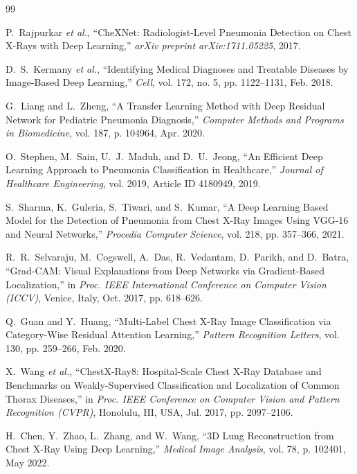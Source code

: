 \documentclass[conference]{IEEEtran}
\begin{document}

\begin{thebibliography}{99}

P.~Rajpurkar \textit{et al.}, ``CheXNet: Radiologist-Level Pneumonia Detection on Chest X-Rays with Deep Learning,'' \emph{arXiv preprint arXiv:1711.05225}, 2017.

D.~S.~Kermany \textit{et al.}, ``Identifying Medical Diagnoses and Treatable Diseases by Image-Based Deep Learning,'' \emph{Cell}, vol. 172, no. 5, pp. 1122–1131, Feb. 2018.

G.~Liang and L.~Zheng, ``A Transfer Learning Method with Deep Residual Network for Pediatric Pneumonia Diagnosis,'' \emph{Computer Methods and Programs in Biomedicine}, vol. 187, p. 104964, Apr. 2020.

O.~Stephen, M.~Sain, U.~J.~Maduh, and D.~U.~Jeong, ``An Efficient Deep Learning Approach to Pneumonia Classification in Healthcare,'' \emph{Journal of Healthcare Engineering}, vol. 2019, Article ID 4180949, 2019.

S.~Sharma, K.~Guleria, S.~Tiwari, and S.~Kumar, ``A Deep Learning Based Model for the Detection of Pneumonia from Chest X-Ray Images Using VGG-16 and Neural Networks,'' \emph{Procedia Computer Science}, vol. 218, pp. 357–366, 2021.

R.~R.~Selvaraju, M.~Cogswell, A.~Das, R.~Vedantam, D.~Parikh, and D.~Batra, ``Grad-CAM: Visual Explanations from Deep Networks via Gradient-Based Localization,'' in \emph{Proc. IEEE International Conference on Computer Vision (ICCV)}, Venice, Italy, Oct. 2017, pp. 618–626.

Q.~Guan and Y.~Huang, ``Multi-Label Chest X-Ray Image Classification via Category-Wise Residual Attention Learning,'' \emph{Pattern Recognition Letters}, vol. 130, pp. 259–266, Feb. 2020.

X.~Wang \textit{et al.}, ``ChestX-Ray8: Hospital-Scale Chest X-Ray Database and Benchmarks on Weakly-Supervised Classification and Localization of Common Thorax Diseases,'' in \emph{Proc. IEEE Conference on Computer Vision and Pattern Recognition (CVPR)}, Honolulu, HI, USA, Jul. 2017, pp. 2097–2106.

H.~Chen, Y.~Zhao, L.~Zhang, and W.~Wang, ``3D Lung Reconstruction from Chest X-Ray Using Deep Learning,'' \emph{Medical Image Analysis}, vol. 78, p. 102401, May 2022.


\end{thebibliography}
\end{document}

